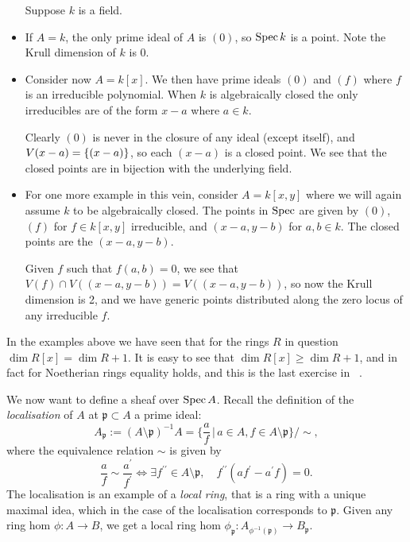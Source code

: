 \documentclass[000-main.tex]{subfiles}
\begin{document}
\begin{example}
  \begin{itemize}
    Suppose $k$ is a field.
    \item If $A = k$, the only prime ideal of $A$ is $(0)$, so $\operatorname{Spec} k$ is a point.
    Note the Krull dimension of $k$ is 0.

    \item Consider now $A = k[x]$.
    We then have prime ideals $(0)$ and $(f)$ where $f$ is an irreducible polynomial.
    When $k$ is algebraically closed the only irreducibles are of the form $x-a$ where $a \in k$.

    Clearly $(0)$ is never in the closure of any ideal (except itself), and $V(x-a) = \qty{(x-a)}$, so each $(x-a)$ is a closed point. %
    We see that the closed points are in bijection with the underlying field.

    \item For one more example in this vein, consider $A = k[x, y]$ where we will again assume $k$ to be algebraically closed.
    The points in $\operatorname{Spec}$ are given by $(0)$, $(f)$ for $f \in k[x, y]$ irreducible, and $(x-a, y-b)$ for $a,b \in k$.
    The closed points are the $(x-a, y-b)$.

    Given $f$ such that $f(a,b)=0$, we see that $V(f) \cap V((x-a, y-b)) = V((x-a, y-b))$, so now the Krull dimension is 2, and we have generic points distributed along the zero locus of any irreducible $f$.
  \end{itemize}
\end{example}

\begin{remark}
  In the examples above we have seen that for the rings $R$ in question $\dim R[x] = \dim R + 1$.
  It is easy to see that $\dim R[x] \geq \dim R + 1$, and in fact for Noetherian rings equality holds, and this is the last exercise in \citeauthor{atiyahIntroductionCommutativeAlgebra2000}~\cite{atiyahIntroductionCommutativeAlgebra2000}.
\end{remark}

We now want to define a sheaf over $\operatorname{Spec} A$.
Recall the definition of the \emph{localisation} of $A$ at $\mathfrak{p} \subset A$ a prime ideal:
\[
  A_{\mathfrak{p}} := (A\setminus \mathfrak{p})^{-1} A = \lbrace \frac{a}{f} \, | \, a \in A, f \in A\setminus \mathfrak{p} \rbrace / \sim,
\]
where the equivalence relation $\sim$ is given by 
\[
  \frac{a}{f} \sim \frac{a^\prime}{f^\prime} \Leftrightarrow \exists f^{\prime \prime} \in A\setminus \mathfrak{p} , \quad f^{\prime \prime}(a f^\prime - a^\prime f) = 0.
\]
The localisation is an example of a \emph{local ring}, that is a ring with a unique maximal idea, which in the case of the localisation corresponds to $\mathfrak{p}$. Given any ring hom $\phi : A \to B$, we get a local ring hom $\phi_{\mathfrak{p}} : A_{\phi^{-1}(\mathfrak{p})} \to B_{\mathfrak{p}}$. 
\end{document}
